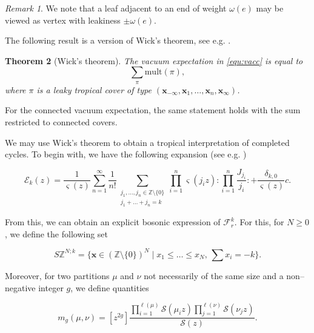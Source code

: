 \documentclass[10pt,a4paper,oneside,no-math,reqno]{amsart}%
\theoremstyle{plain}
\newtheorem{theorem}{Theorem}[section]
\theoremstyle{definition}
\theoremstyle{remark}
\newtheorem{remark}[theorem]{Remark}
\numberwithin{equation}{section}
\newcommand{\mb}[1]{\mathbb{#1}}
\newcommand{\1}{\mathds{1}}
\newcommand{\Z}{\mb{Z}}
\newcommand{\<}{\langle}
\renewcommand{\>}{\rangle}
\begin{document}
\begin{remark}
    We note that a leaf adjacent to an end of weight $\omega(e)$ may be viewed as vertex with leakiness $\pm \omega(e)$.
\end{remark}

The following result is a version of Wick's theorem, see e.g. \cite{Wic50,BG16}.

\begin{theorem}[{Wick's theorem}]
    The vacuum expectation in \cref{equ:vacc} is equal to
    \begin{equation}
        \sum_\pi\mathrm{mult}(\pi),
    \end{equation}
    where $\pi$ is a leaky tropical cover of type $(\mathbf{x}_{-\infty},\mathbf{x}_1,\dots,\mathbf{x}_n,\mathbf{x}_\infty)$.
\end{theorem}

For the connected vacuum expectation, the same statement holds with the sum restricted to connected covers.


We may use Wick's theorem to obtain a tropical interpretation of completed cycles. To begin with, we have the following expansion (see e.g. \cite{AKL25})

\begin{equation}
    \mathcal{E}_{k}(z)
    =
    \frac{1}{\varsigma(z)} \sum_{n=1}^\infty\frac{1}{n!} \sum_{\substack{j_1,\dots,j_n\in\Z\setminus\{0\}\\j_1+\dots+j_n=k}} \prod_{i=1}^n \varsigma (j_iz)\colon\prod_{i=1}^n\frac{J_{j_i}}{j_i}\colon+\frac{\delta_{k,0}}{\varsigma(z)} c.
\end{equation}

From this, we can obtain an explicit bosonic expression of $\mathcal{F}_r^k$. For this, for $N\ge0$, we define the following set

\begin{equation}
    S\mathbb{Z}^{N;k}
    =
    \{ \textbf{x}\in(\mathbb{Z}\setminus\{0\})^N\mid x_1\le \dots\le x_N,\,\sum x_i=-k \}.
\end{equation}

Moreover, for two partitions $\mu$ and $\nu$ not necessarily of the same size and a non--negative integer $g$, we define quantities

\begin{equation}
    m_g(\mu,\nu)
    =
    [z^{2g}] \frac{\prod_{i=1}^{\ell(\mu)} \mathcal{S}(\mu_iz) \prod_{j=1}^{\ell(\nu)} \mathcal{S}(\nu_jz)}{\mathcal{S}(z)}.
\end{equation}
\end{document}
